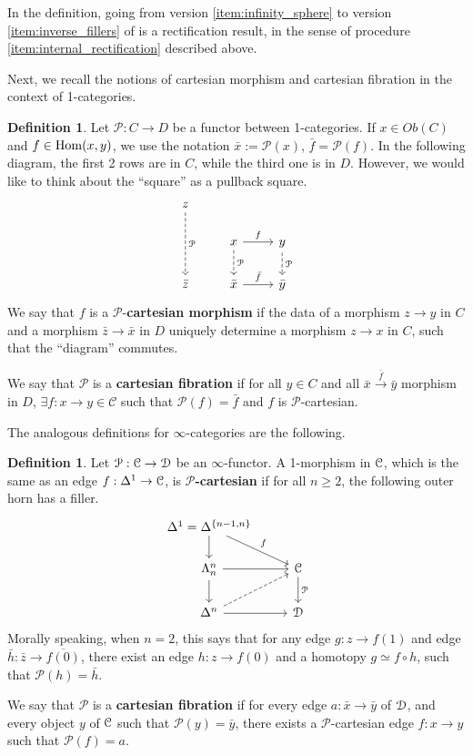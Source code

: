 \documentclass[10pt,a4paper,reqno,oneside]{book} %
\theoremstyle{plain}
\theoremstyle{definition}
\newtheorem{defin}[thm]{Definition}
\theoremstyle{remark}
\numberwithin{equation}{section}
\begin{document}
In the definition, going from version \ref{item:infinity_sphere} to version \ref{item:inverse_fillers} of is a rectification result,
in the sense of procedure \ref{item:internal_rectification} described above.

Next, we recall the notions of cartesian morphism and cartesian fibration in the context of 1-categories.
\begin{defin}
Let $\mathcal{P} : C \to D$ be a functor between 1-categories. If $x \in Ob(C)$ and $f\in \operatorname{Hom}(x,y)$, we use the notation
$\bar x := \mathcal{P}(x)$, $\bar f = \mathcal{P}(f)$. In the following diagram, the first 2 rows are in $C$, while the
third one is in $D$. However, we would like to think about the ``square'' as a pullback square.
\[
\begin{tikzcd}
z\arrow[dashed]{dd}{\mathcal{P}} & & \\
& x\arrow{r}{f}\arrow[dashed]{d}{\mathcal{P}} & y\arrow[dashed]{d}{\mathcal{P}} \\
\bar z & \bar x \arrow{r}{\bar f} & \bar y
\end{tikzcd}
\]
We say that $f$ is a $\mathcal{P}$-\textbf{cartesian morphism} if the data of a morphism $z \to y$ in $C$ and a 
morphism $\bar z \to \bar x$
in $D$ uniquely determine a morphism $z \to x$ in $C$, such that the ``diagram'' commutes.

We say that $\mathcal{P}$ is a \textbf{cartesian fibration} if for all $y \in C$ and all $\bar x \overset{\bar f}{\to} \bar y$ 
morphism in $D$, $\exists f : x \to y \in \mathcal{C}$ such that $\mathcal{P}(f) = \bar f$ and $f$ is $\mathcal{P}$-cartesian.
\end{defin}

The analogous definitions for $\infty$-categories are the following.

\begin{defin}
Let $\mathcal{P} : \mathcal C \to \mathcal D$ be an $\infty$-functor. A 1-morphism in $\mathcal C$, which is the same as an edge $f: \Delta^1
\to \mathcal C$, is $\mathcal{P}$\textbf{-cartesian} if for all $n\geq 2$, the following outer horn has a filler.
\[
\begin{tikzcd}
\Delta^1 = \Delta^{\{n-1,n\}}\arrow{d}\arrow{dr}{f} & \\
\Lambda^n_n\arrow{d}\arrow{r} & \cC \arrow{d}{\mathcal{P}} \\
\Delta^n \arrow{r}\arrow[dashed]{ur} & \cD
\end{tikzcd}
\]
Morally speaking, when $n=2$, this says that for any edge $g: z \to f(1)$ and edge $\bar h : \bar z \to \overline{f(0)}$,
there exist an edge $h : z \to f(0)$ and a homotopy $g \simeq f \circ h$, such that $\mathcal{P}(h) = \bar h$.

We say that $\mathcal{P}$ is a \textbf{cartesian fibration} if for every edge $a : \bar x \to \bar y$ of $\mathcal D$, and every
object $y$ of $\mathcal C$ such that $\mathcal{P}(y) = \bar y$, there exists a $\mathcal{P}$-cartesian edge $f : x \to y$ such that
$\mathcal{P}(f) = a$.
\end{defin}
\end{document}
